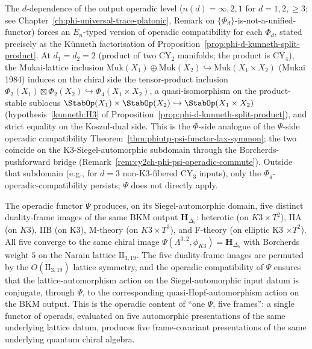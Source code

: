 \begin{remark}
\label{rem:cy2ch-phi-d-operadic-tensor}
The $d$-dependence of the output operadic level
\textup{(}$n(d) = \infty, 2, 1$ for $d = 1, 2, \ge 3$; see
Chapter~\ref{ch:phi-universal-trace-platonic}, Remark on
$\{\Phi_d\}$-is-not-a-unified-functor\textup{)} forces an $E_n$-typed
version of operadic compatibility for each $\Phi_d$, stated precisely
as the K\"unneth factorisation of
Proposition~\ref{prop:phi-d-kunneth-split-product}. At $d_1 = d_2 = 2$
\textup{(}product of two CY$_2$ manifolds; the product is CY$_4$\textup{),}
the Mukai-lattice inclusion
$\mathrm{Muk}(X_1) \oplus \mathrm{Muk}(X_2) \hookrightarrow
\mathrm{Muk}(X_1 \times X_2)$ \textup{(}Mukai 1984\textup{)} induces on the chiral side
the tensor-product inclusion
$\Phi_2(X_1) \boxtimes \Phi_2(X_2) \hookrightarrow \Phi_4(X_1 \times X_2)$,
a quasi-isomorphism on the product-stable sublocus
$\StabOp(X_1) \times \StabOp(X_2) \hookrightarrow \StabOp(X_1 \times X_2)$
\textup{(}hypothesis~\ref{kunneth:H3} of
Proposition~\ref{prop:phi-d-kunneth-split-product}\textup{),} and strict
equality on the Koszul-dual side. This is the $\Phi$-side analogue of the
$\Psi$-side operadic compatibility
Theorem~\ref{thm:phiutp-psi-functor-lax-symmon}; the two coincide on the
K3-Siegel-automorphic subdomain through the Borcherds-pushforward
bridge (Remark~\ref{rem:cy2ch-phi-psi-operadic-commute}). Outside that
subdomain (e.g., for $d = 3$ non-K3-fibered CY$_3$ inputs), only the
$\Phi_d$-operadic-compatibility persists; $\Psi$ does not directly apply.
\end{remark}

\begin{remark}
\label{rem:cy2ch-psi-witten-five-image}
The operadic functor $\Psi$ produces, on its Siegel-automorphic domain,
five distinct duality-frame images of the same BKM output
$\mathbf{H}_{\Delta_5}$: heterotic (on $K3 \times T^2$), IIA (on $K3$),
IIB (on K3), M-theory (on $K3 \times T^3$), and F-theory (on
elliptic K3 $\times T^2$). All five converge to the same chiral image
$\Psi(\Lambda^{3,2}, \phi_{K3}) = \mathbf{H}_{\Delta_5}$ with
Borcherds weight $5$ on the Narain lattice $\mathrm{II}_{3,19}$. The
five duality-frame images are permuted by the $O(\mathrm{II}_{3,19})$
lattice symmetry, and the operadic compatibility of $\Psi$ ensures
that the lattice-automorphism action on the Siegel-automorphic input
datum is conjugate, through $\Psi$, to the corresponding
quasi-Hopf-automorphism action on the BKM output. This is the operadic
content of ``one $\Psi$, five frames'': a single functor of operads,
evaluated on five automorphic presentations of the same underlying
lattice datum, produces five frame-covariant presentations of the same
underlying quantum chiral algebra.
\end{remark}

